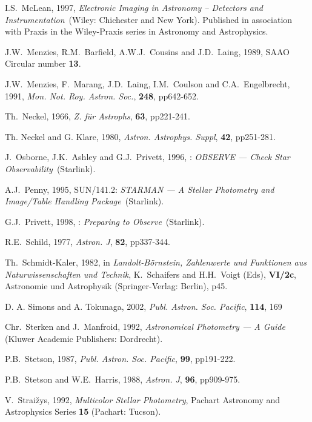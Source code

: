\documentclass[twoside,11pt,nolof]{starlink}
\begin{document}
\begin{thebibliography}{99}
   I.S.~McLean, 1997, \textit{Electronic Imaging in
   Astronomy -- Detectors and Instrumentation}\, (Wiley: Chichester and
   New York).  Published in association with Praxis in the Wiley-Praxis
   series in Astronomy and Astrophysics.

   J.W.~Menzies, R.M.~Barfield, A.W.J.~Cousins and
   J.D.~Laing, 1989, SAAO Circular number \textbf{13}.

   J.W.~Menzies, F.~Marang, J.D.~Laing, I.M.~Coulson
   and C.A.~Engelbrecht, 1991, \textit{Mon. Not. Roy. Astron. Soc.},
   \textbf{248}, pp642-652.

   Th.~Neckel, 1966, \textit{Z. f\"{u}r Astrophs}, \textbf{63}, pp221-241.

   Th. Neckel and G. Klare, 1980, \textit{Astron.
   Astrophys. Suppl}, \textbf{42}, pp251-281.

   J.~Osborne, J.K.~Ashley and G.J.~Privett, 1996,
   : \textit{OBSERVE --- Check Star Observability}\,
   (Starlink).

   A.J.~Penny, 1995, SUN/141.2: \textit{STARMAN --- A
   Stellar Photometry and Image/Table Handling Package}\, (Starlink).

   G.J.~Privett, 1998, : \textit{Preparing to Observe}\, (Starlink).

   R.E.~Schild, 1977, \textit{Astron. J}, \textbf{82},
   pp337-344.

   Th.~Schmidt-Kaler, 1982, in \textit{Landolt-B\"{o}rnstein, Zahlenwerte und Funktionen aus
   Naturwissenschaften und Technik}, K.~Schaifers and H.H.~Voigt (Eds),
   \textbf{VI/2c}, Astronomie und Astrophysik (Springer-Verlag: Berlin), p45.

   D. A. Simons and A. Tokunaga, 2002,
   \textit{Publ. Astron. Soc. Pacific}, \textbf{114}, 169

   Chr.~Sterken and J.~Manfroid, 1992, \textit{Astronomical Photometry --- A Guide}\, (Kluwer Academic Publishers:
   Dordrecht).

   P.B.~Stetson, 1987, \textit{Publ. Astron.
   Soc. Pacific}, \textbf{99}, pp191-222.

   P.B.~Stetson and W.E.~Harris, 1988, \textit{Astron. J}, \textbf{96}, pp909-975.

   V.~Strai\v{z}ys, 1992, \textit{Multicolor
   Stellar Photometry}, Pachart Astronomy and Astrophysics Series \textbf{15}
   (Pachart: Tucson).


\end{thebibliography}
\end{document}
